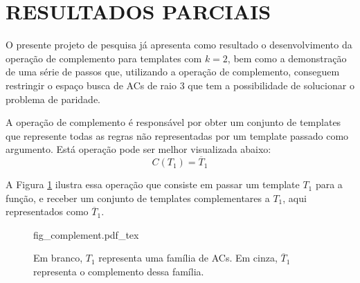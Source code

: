\section{RESULTADOS PARCIAIS}
\label{sec:resultadosParciais}

O presente projeto de pesquisa já apresenta como resultado o desenvolvimento da operação de complemento para templates com $k=2$, bem como a demonstração de uma série de passos que, utilizando a operação de complemento, conseguem restringir o espaço busca de ACs de raio 3 que tem a possibilidade de solucionar o problema de paridade.

A operação de complemento é responsável por obter um conjunto de templates que represente todas as regras não representadas por um template passado como argumento. Está operação pode ser melhor visualizada abaixo:
\begin{equation}
C(T_1)=\overline{T}_1
\end{equation}

A Figura \ref{fig:complement} ilustra essa operação que consiste em passar um template $T_1$ para a função, e receber um conjunto de templates complementares a $T_1$, aqui representados como $\overline{T}_1$.
\begin{figure}[h!]
  \centering
  \def\svgscale{0.5}
  {fig_complement.pdf_tex}
  \caption{Em branco, $T_1$ representa uma família de ACs. Em cinza, $\overline{T}_1$ representa o complemento dessa família.}
  \label{fig:complement}
\end{figure}

